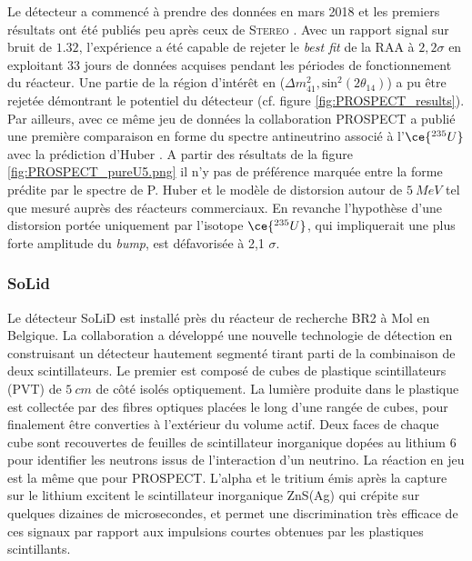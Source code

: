 Le détecteur a commencé à prendre des données en mars 2018 et les premiers résultats ont été publiés peu après ceux de \textsc{Stereo} \cite{Ashenfelter:2018iov}. Avec un rapport signal sur bruit de $1.32$, l'expérience a été capable de rejeter le \textit{best fit} de la RAA à $2,2\sigma$ en exploitant 33 jours de données acquises pendant les périodes de fonctionnement du réacteur. Une partie de la région d'intérêt en ($\Delta m^2_{41}, \textrm{sin}^2(2\theta_{14})$) a pu être rejetée démontrant le potentiel du détecteur (cf. figure \ref{fig:PROSPECT_results}). Par ailleurs, avec ce même jeu de données la collaboration PROSPECT a publié une première comparaison en forme du spectre antineutrino associé à l'$\ce{^{235}U}$ avec la prédiction d'Huber \cite{Ashenfelter:2018jrx}. A partir des résultats de la figure \ref{fig:PROSPECT_pureU5.png} il n'y pas de préférence marquée entre la forme prédite par le spectre de P. Huber et le modèle de distorsion autour de $\SI{5}{MeV}$ tel que mesuré auprès des réacteurs commerciaux. En revanche l'hypothèse d'une distorsion portée uniquement par l'isotope $\ce{^{235}U}$, qui impliquerait une plus forte amplitude du \textit{bump}, est défavorisée à 2,1 $\sigma$.

\bigbreak

\subsubsection*{SoLid}

Le détecteur SoLiD est installé près du réacteur de recherche BR2 à Mol en Belgique. La collaboration a développé une nouvelle technologie de détection en construisant un détecteur hautement segmenté tirant parti de la combinaison de deux scintillateurs. Le premier est composé de cubes de plastique scintillateurs (PVT) de $\SI{5}{cm}$ de côté isolés optiquement. La lumière produite dans le plastique est collectée par des fibres optiques placées le long d'une rangée de cubes, pour finalement être converties à l'extérieur du volume actif. Deux faces de chaque cube sont recouvertes de feuilles de scintillateur inorganique dopées au lithium 6 pour identifier les neutrons issus de l'interaction d'un neutrino. La réaction en jeu est la même que pour PROSPECT. L'alpha et le tritium émis après la capture sur le lithium excitent le scintillateur inorganique ZnS(Ag) qui crépite sur quelques dizaines de microsecondes, et permet une discrimination très efficace de ces signaux par rapport aux impulsions courtes obtenues par les plastiques scintillants.\\

